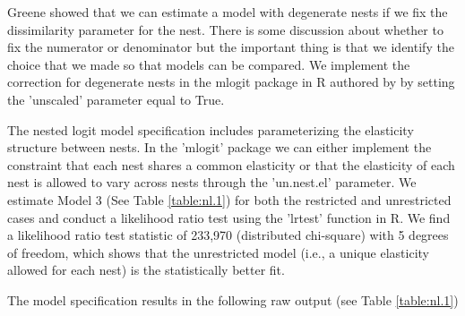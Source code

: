 \documentclass[10pt]{amsart}
\begin{document}
Greene showed that we can estimate a model with degenerate nests if we fix the dissimilarity parameter for the nest.
There is some discussion about whether to fix the numerator or denominator \parencite{} but the important thing is that we identify the choice that we made so that models can be compared. 
We implement the correction for degenerate nests in the mlogit package in R authored by \cite{mlogit2013} by setting the 'unscaled' parameter equal to True. 

The nested logit model specification includes parameterizing the elasticity structure between nests.
In the 'mlogit' package we can either implement the constraint that each nest shares a common elasticity or that the elasticity of each nest is allowed to vary across nests through the 'un.nest.el' parameter.
We estimate Model 3 (See Table \ref{table:nl.1}) for both the restricted and unrestricted cases and conduct a likelihood ratio test using the 'lrtest' function in R. 
We find a likelihood ratio test statistic of 233,970 (distributed chi-square) with 5 degrees of freedom, which shows that the unrestricted model (i.e., a unique elasticity allowed for each nest) is the statistically better fit.   

The model specification results in the following raw output (see Table \ref{table:nl.1})
\end{document}
